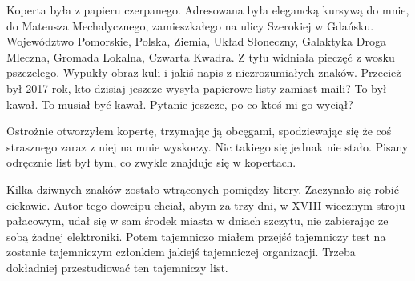 Koperta była z papieru czerpanego.
Adresowana była elegancką kursywą do mnie, do Mateusza Mechalycznego, zamieszkałego na ulicy Szerokiej w Gdańsku.
Województwo Pomorskie, Polska, Ziemia, Układ Słoneczny, Galaktyka Droga Mleczna, Gromada Lokalna, Czwarta Kwadra.
Z tyłu widniała pieczęć z wosku pszczelego.
Wypukły obraz kuli i jakiś napis z niezrozumiałych znaków.
Przecież był 2017 rok, kto dzisiaj jeszcze wysyła papierowe listy zamiast maili?
To był kawał. To musiał być kawał. Pytanie jeszcze, po co ktoś mi go wyciął?

Ostrożnie otworzyłem kopertę, trzymając ją obcęgami, spodziewając się że coś strasznego zaraz z niej na mnie wyskoczy.
Nic takiego się jednak nie stało.
Pisany odręcznie list był tym, co zwykle znajduje się w kopertach.


Kilka dziwnych znaków zostało wtrąconych pomiędzy litery. Zaczynało się robić ciekawie. Autor tego dowcipu chciał, abym za trzy dni, w XVIII wiecznym stroju pałacowym,
udał się w sam środek miasta w dniach szczytu, nie zabierając ze sobą żadnej elektroniki.
Potem tajemniczo miałem przejść tajemniczy test na zostanie tajemniczym członkiem jakiejś tajemniczej organizacji.
Trzeba dokładniej przestudiować ten tajemniczy list.

